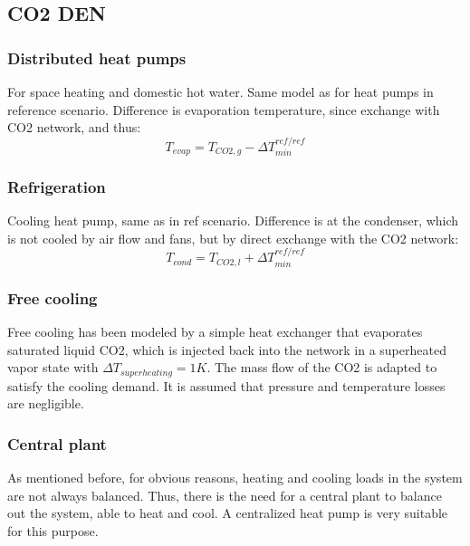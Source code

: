\documentclass{article}
\begin{document}

\subsection{CO2 DEN}

\subsubsection{Distributed heat pumps}
For space heating and domestic hot water.
Same model as for heat pumps in reference scenario. 
Difference is evaporation temperature, since exchange with CO2 network, and thus:
\begin{equation}
    T_{evap} = T_{CO2,g} - \Delta T_{min}^{ref/ref}
\end{equation}

\subsubsection{Refrigeration}
Cooling heat pump, same as in ref scenario.
Difference is at the condenser, which is not cooled by air flow and fans, but by direct exchange with the CO2 network:
\begin{equation}
    T_{cond} = T_{CO2,l} + \Delta T_{min}^{ref/ref}
\end{equation}

\subsubsection{Free cooling}
Free cooling has been modeled by a simple heat exchanger that evaporates saturated liquid CO2, which is injected back into the network in a superheated vapor state with $\Delta T_{superheating} = 1K$. The mass flow of the CO2 is adapted to satisfy the cooling demand. It is assumed that pressure and temperature losses are negligible.

\subsubsection{Central plant}
As mentioned before, for obvious reasons, heating and cooling loads in the system are not always balanced. Thus, there is the need for a central plant to balance out the system, able to heat and cool. A centralized heat pump is very suitable for this purpose.
\end{document}
